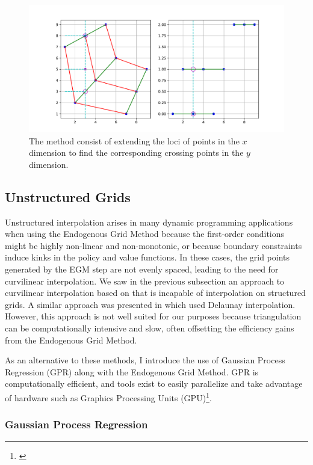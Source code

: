 \begin{figure}
  \centering
  \includegraphics[width=0.8\linewidth]{Figures/Mapping.pdf}
  \caption{The method consist of extending the loci of points in the $x$ dimension to find the corresponding crossing points in the $y$ dimension.}
  \notinsubfile{\label{fig:mapping}}
\end{figure}



\subsection{Unstructured Grids}

Unstructured interpolation arises in many dynamic programming applications when using the Endogenous Grid Method because the first-order conditions might be highly non-linear and non-monotonic, or because boundary constraints induce kinks in the policy and value functions. In these cases, the grid points generated by the EGM step are not evenly spaced, leading to the need for curvilinear interpolation. We saw in the previous subsection an approach to curvilinear interpolation based on \cite{White2015} that is incapable of interpolation on structured grids. A similar approach was presented in \cite{Ludwig2018} which used Delaunay interpolation. However, this approach is not well suited for our purposes because triangulation can be computationally intensive and slow, often offsetting the efficiency gains from the Endogenous Grid Method.

As an alternative to these methods, I introduce the use of Gaussian Process Regression (GPR) along with the Endogenous Grid Method. GPR is computationally efficient, and tools exist to easily parallelize and take advantage of hardware such as Graphics Processing Units (GPU)\footnote{\cite{Gardner2018}}.


\subsubsection{Gaussian Process Regression}

